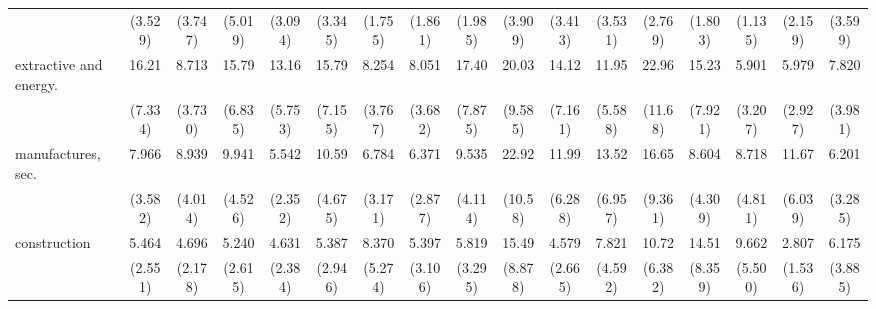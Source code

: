 {\begin{tabular}{l*{16}{c}}
                    &     (3.529)         &     (3.747)         &     (5.019)         &     (3.094)         &     (3.345)         &     (1.755)         &     (1.861)         &     (1.985)         &     (3.909)         &     (3.413)         &     (3.531)         &     (2.769)         &     (1.803)         &     (1.135)         &     (2.159)         &     (3.599)         \\
[1em]
extractive and energy.&       16.21\sym{***}&       8.713\sym{***}&       15.79\sym{***}&       13.16\sym{***}&       15.79\sym{***}&       8.254\sym{***}&       8.051\sym{***}&       17.40\sym{***}&       20.03\sym{***}&       14.12\sym{***}&       11.95\sym{***}&       22.96\sym{***}&       15.23\sym{***}&       5.901\sym{**} &       5.979\sym{***}&       7.820\sym{***}\\
                    &     (7.334)         &     (3.730)         &     (6.835)         &     (5.753)         &     (7.155)         &     (3.767)         &     (3.682)         &     (7.875)         &     (9.585)         &     (7.161)         &     (5.588)         &     (11.68)         &     (7.921)         &     (3.207)         &     (2.927)         &     (3.981)         \\
[1em]
manufactures, sec.  &       7.966\sym{***}&       8.939\sym{***}&       9.941\sym{***}&       5.542\sym{***}&       10.59\sym{***}&       6.784\sym{***}&       6.371\sym{***}&       9.535\sym{***}&       22.92\sym{***}&       11.99\sym{***}&       13.52\sym{***}&       16.65\sym{***}&       8.604\sym{***}&       8.718\sym{***}&       11.67\sym{***}&       6.201\sym{***}\\
                    &     (3.582)         &     (4.014)         &     (4.526)         &     (2.352)         &     (4.675)         &     (3.171)         &     (2.877)         &     (4.114)         &     (10.58)         &     (6.288)         &     (6.957)         &     (9.361)         &     (4.309)         &     (4.811)         &     (6.039)         &     (3.285)         \\
[1em]
construction        &       5.464\sym{***}&       4.696\sym{***}&       5.240\sym{***}&       4.631\sym{**} &       5.387\sym{**} &       8.370\sym{***}&       5.397\sym{**} &       5.819\sym{**} &       15.49\sym{***}&       4.579\sym{**} &       7.821\sym{***}&       10.72\sym{***}&       14.51\sym{***}&       9.662\sym{***}&       2.807         &       6.175\sym{**} \\
                    &     (2.551)         &     (2.178)         &     (2.615)         &     (2.384)         &     (2.946)         &     (5.274)         &     (3.106)         &     (3.295)         &     (8.878)         &     (2.665)         &     (4.592)         &     (6.382)         &     (8.359)         &     (5.500)         &     (1.536)         &     (3.885)         \\

\end{tabular}}
